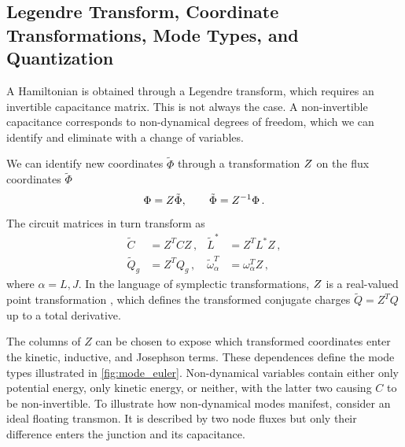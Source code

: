 

\subsection{Legendre Transform, Coordinate Transformations, Mode Types, and Quantization} \label{sec:ModeTypes}

A Hamiltonian is obtained through a Legendre transform, which requires an invertible capacitance matrix. This is not always the case.
A non-invertible capacitance corresponds to non-dynamical degrees of freedom, which we can identify and eliminate with a change of variables.

We can identify new coordinates $\tilde \Phi$ through a transformation $Z$ on the flux coordinates $\tilde\Phi$
\begin{align}
    \Phi=Z\tilde\Phi,
    \qquad \tilde\Phi=Z^{-1}\Phi \, .
    \label{eq:coordinate_map_main}
\end{align}
The circuit matrices in turn transform as
\begin{equation}
\begin{aligned}
    \tilde C &= Z^TCZ\,, & \tilde L^* &= Z^TL^*Z\,,\\
    \tilde Q_g &= Z^TQ_g\,, & \tilde\omega_\alpha^T &= \omega_\alpha^TZ\,,
\end{aligned}
\label{eq:coordinate_objects_main}
\end{equation}
where $\alpha=L,J$.
In the language of symplectic transformations, $Z$ is a real-valued point transformation \cite{salcedoGyratorsSuperconductingCircuit2026},
which defines the transformed conjugate charges $\tilde Q = Z^{T}Q$ up to a total derivative.

The columns of $Z$ can be chosen to expose which transformed coordinates enter the kinetic, inductive, and Josephson terms.
These dependences define the mode types illustrated in \cref{fig:mode_euler}.
Non-dynamical variables contain either only potential energy, only kinetic energy, or neither, with the latter two causing $C$ to be non-invertible.
To illustrate how non-dynamical modes manifest, consider an ideal floating transmon.
It is described by two node fluxes but only their difference enters the junction and its capacitance.

